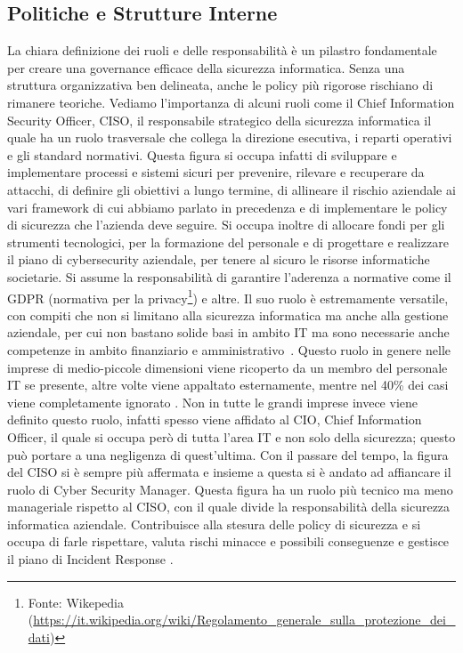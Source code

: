         \subsection{Politiche e Strutture Interne}
            La chiara definizione dei ruoli e delle responsabilità è un pilastro fondamentale per creare una governance efficace della sicurezza informatica. Senza una struttura organizzativa ben delineata, anche le policy più rigorose rischiano di rimanere teoriche. Vediamo l'importanza di alcuni ruoli come il Chief Information Security Officer, CISO, il responsabile strategico della sicurezza informatica il quale ha un ruolo trasversale che collega la direzione esecutiva, i reparti operativi e gli standard normativi. Questa figura si occupa infatti di sviluppare e implementare processi e sistemi sicuri per prevenire, rilevare e recuperare da attacchi, di definire gli obiettivi a lungo termine, di allineare il rischio aziendale ai vari framework di cui abbiamo parlato in precedenza e di implementare le policy di sicurezza che l'azienda deve seguire. Si occupa inoltre di allocare fondi per gli strumenti tecnologici, per la formazione del personale e di progettare e realizzare il piano di cybersecurity aziendale, per tenere al sicuro le risorse informatiche societarie.
            Si assume la responsabilità di garantire l'aderenza a normative come il GDPR (normativa per la privacy\footnote{Fonte: Wikepedia (\url{https://it.wikipedia.org/wiki/Regolamento_generale_sulla_protezione_dei_dati})}) e altre. Il suo ruolo è estremamente versatile, con compiti che non si limitano alla sicurezza informatica ma anche alla gestione aziendale, per cui non bastano solide basi in ambito IT ma sono necessarie anche competenze in ambito finanziario e amministrativo~\cite{ciso_cisco}. Questo ruolo in genere nelle imprese di medio-piccole dimensioni viene ricoperto da un membro del personale IT se presente, altre volte viene appaltato esternamente, mentre nel 40\% dei casi viene completamente ignorato \cite{ciso_csm_and_percentage}. Non in tutte le grandi imprese invece viene definito questo ruolo, infatti spesso viene affidato al CIO, Chief Information Officer, il quale si occupa però di tutta l'area IT e non solo della sicurezza; questo può portare a una negligenza di quest'ultima.
            Con il passare del tempo, la figura del CISO si è sempre più affermata e insieme a questa si è andato ad affiancare il ruolo di Cyber Security Manager. Questa figura ha un ruolo più tecnico ma meno manageriale rispetto al CISO, con il quale divide la responsabilità della sicurezza informatica aziendale. Contribuisce alla stesura delle policy di sicurezza e si occupa di farle rispettare, valuta rischi minacce e possibili conseguenze e gestisce il piano di Incident Response \cite{ciso_csm_and_percentage}.



